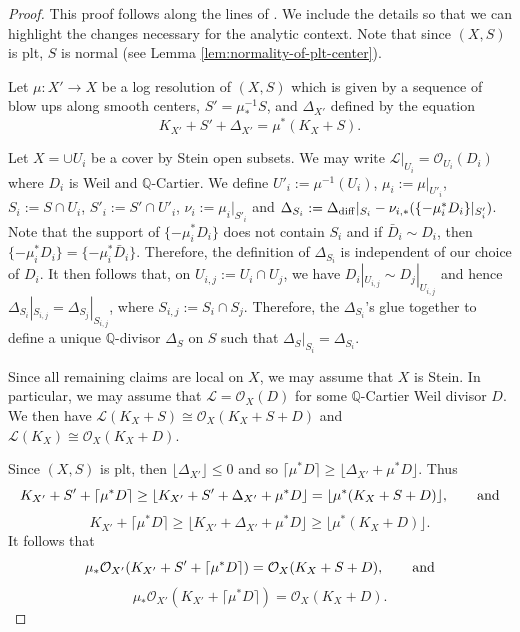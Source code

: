 \documentclass[12pt]{amsart}
\theoremstyle{plain}
\theoremstyle{remark}
\theoremstyle{definition}
\newcommand{\<}{\leq}
\def\>{\geq}
\newcommand{\mbQ}{\mathbb{Q}}
\newcommand{\OO}{{\mathcal{O}}}
\newcommand{\Q}{{\mathbb{Q}}}
\def\>{\geq}
\theoremstyle{definition}
\theoremstyle{definition}
\numberwithin{equation}{section}
\theoremstyle{remark}
\begin{document}
\begin{proof} This proof follows along the lines of \cite[Proposition 3.1]{HW19}. We include the details so that we can highlight the changes necessary for the analytic context.
    Note that since $(X,S) $ is plt,  $S$ is normal (see Lemma \ref{lem:normality-of-plt-center}).
      
    Let $\mu:X'\to X$ be a log resolution of $(X,S)$ which is given by a sequence of blow ups along smooth centers, $S'=\mu ^{-1}_*S$, and $\Delta _{X'}$ defined by the equation
    \[K_{X'}+S'+\Delta _{X'}=\mu ^*(K_X+S). \]
    

    Let $X=\cup U_i$ be a cover by Stein open subsets. We may write $\mathcal L |_{U_i}=\OO _{U_i}(D_i)$ where $D_i$ is Weil and $\Q$-Cartier. We define $U'_i:=\mu ^{-1}(U_i)$, $\mu _i:=\mu |_{U'_i}$, $S_i:=S\cap U_i$, $S'_i:=S'\cap U'_i$, $\nu _i:=\mu _i|_{S'_i}$ and $\Delta_{S_i}:=\Delta _{\rm diff}|_{S_i}-\nu _{i,*} (\{-\mu_i^*D_i\}|_{S'_i})$.
    Note that the support of $\{-\mu_i^*D_i\}$ does not contain $S_i$ and if $\bar D_i\sim D_i$, then $\{-\mu_i^*D_i\}=\{-\mu_i^*\bar D_i\}$. Therefore, the definition of $\Delta_{S_i}$ is independent of our choice of $D_i$. It then follows that, on $U_{i,j}:=U_i\cap U_j$, we have $D_i|_{U_{i,j}}\sim D_j|_{U_{i,j}}$ and hence $\Delta_{S_i}|_{S_{i,j}}=\Delta_{S_j}|_{S_{i,j}}$, where $S_{i,j}:=S_i\cap S_j$.
    Therefore, the $\Delta_{S_i}$'s glue together to define a unique $\mbQ$-divisor $\Delta_S$ on $S$ such that $\Delta_S |_{S_i}=\Delta_{S_i}$.
    
    Since all remaining claims are local on $X$, we may assume that $X$ is Stein. In particular, we may assume that $\mathcal L=\OO _X(D)$ for some $\Q$-Cartier Weil divisor $D$. We then have $\mathcal L(K_X+S)\cong \OO _X(K_{X}+S +D)$ and
    $\mathcal L(K_X)\cong \OO _X(K_{X} +D)$.
    
    Since $(X,S)$ is plt, then $\lfloor \Delta _{X'} \rfloor \leq 0$ and so $\lceil \mu ^*D\rceil \geq \lfloor \Delta _{X'} +\mu ^*D \rfloor$.
    Thus
    \[K_{X'}+S'+\lceil \mu ^*D\rceil\geq \lfloor K_{X'}+S'+\Delta _{X'} +\mu ^*D \rfloor =\lfloor \mu ^*(K_X+S +D) \rfloor , \qquad {\rm and}\]
    \[K_{X'}+\lceil \mu ^*D\rceil\geq \lfloor K_{X'}+\Delta _{X'} +\mu ^*D \rfloor \>\lfloor \mu ^*(K_X+D) \rfloor .\]
    It follows that 
    \[\mu _* \OO _{X'}(K_{X'}+S'+\lceil \mu ^*D\rceil)=\OO _X(K_{X}+S +D), \qquad {\rm and}\]
    \[\mu _* \OO _{X'}(K_{X'}+\lceil \mu ^*D\rceil)=\OO _X(K_{X} +D).\]


\end{proof}
\end{document}
